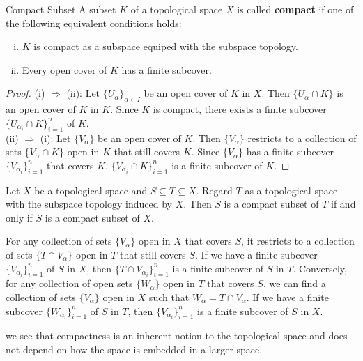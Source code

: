 \documentclass{report}
\begin{document}
\begin{definition}{Compact Subset}{}
	A subset $K$ of a topological space $X$ is called \textbf{compact} if one of the following equivalent conditions holds:

	\begin{enumerate}[(i)]
		\item $K$ is compact as a subspace equiped with the subspace topology.
		\item Every open cover of $K$ has a finite subcover.
	\end{enumerate}
\end{definition}

\begin{proof}
	(i) $\Rightarrow$ (ii): Let $\{U_\alpha\}_{\alpha\in I
	}$ be an open cover of $K$ in $X$. Then $\{U_\alpha\cap K\}$ is an open cover of $K$ in $K$. Since $K$ is compact, there exists a finite subcover $\{U_{\alpha_i}\cap K\}_{i=1}^n$ of $K$.\\
	(ii) $\Rightarrow$ (i): Let $\{V_\alpha\}$ be an open cover of $K$. Then $\{V_\alpha\}$ restricts to a collection of sets $\{V_\alpha\cap K\}$ open in $K$ that still covers $K$. Since $\{V_\alpha\}$ has a finite subcover $\{V_{\alpha_i}\}_{i=1}^n$ that covers $K$, $\{V_{\alpha_i}\cap K\}_{i=1}^n$ is a finite subcover of $K$.
\end{proof}

\begin{lemma}{}{}
	Let $X$ be a topological space and $S \subseteq T \subseteq X$. Regard $T$ as a topological space with the subspace topology induced by $X$. Then $S$ is a compact subset of $T$ if and only if $S$ is a compact subset of $X$.
\end{lemma}

\begin{prf}
	For any collection of sets $\{V_\alpha\}$ open in $X$ that covers $S$, it restricts to a collection of sets $\{T\cap V_\alpha\}$ open in $T$ that still covers $S$. If we have a finite subcover $\{V_{\alpha_i}\}_{i=1}^n$ of $S$ in $X$, then $\{T\cap V_{\alpha_i}\}_{i=1}^n$ is a finite subcover of $S$ in $T$. Conversely, for any collection of open sets $\{W_\alpha\}$ open in $T$ that covers $S$, we can find a collection of sets $\{V_\alpha\}$ open in $X$ such that $W_\alpha=T\cap V_\alpha$. If we have a finite subcover $\{W_{\alpha_i}\}_{i=1}^n$ of $S$ in $T$, then $\{V_{\alpha_i}\}_{i=1}^n$ is a finite subcover of $S$ in $X$.
\end{prf}

we see that compactness is an inherent notion to the topological space and does not depend on how the space is embedded in a larger space.
\end{document}
